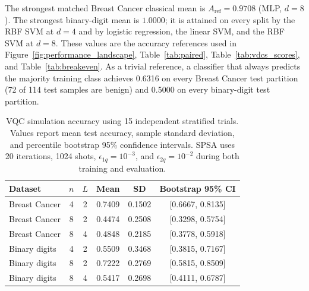 \documentclass[final,5p,times,number]{elsarticle}
\begin{document}
\begin{table}[!t]
{\begin{tabular}{llcccc}
\bottomrule
\end{tabular}}
\end{table}

The strongest matched Breast Cancer classical mean is $A_{\mathrm{ref}}=0.9708$ (MLP, $d=8$). The strongest binary-digit mean is $1.0000$; it is attained on every split by the RBF SVM at $d=4$ and by logistic regression, the linear SVM, and the RBF SVM at $d=8$. These values are the accuracy references used in Figure~\ref{fig:performance_landscape}, Table~\ref{tab:paired}, Table~\ref{tab:vdcs_scores}, and Table~\ref{tab:breakeven}. As a trivial reference, a classifier that always predicts the majority training class achieves 0.6316 on every Breast Cancer test partition (72 of 114 test samples are benign) and 0.5000 on every binary-digit test partition.

\begin{table}[!t]
\centering
\caption{VQC simulation accuracy using 15 independent stratified trials. Values report mean test accuracy, sample standard deviation, and percentile bootstrap 95\% confidence intervals. SPSA uses 20 iterations, 1024 shots, $\epsilon_{1q}=10^{-3}$, and $\epsilon_{2q}=10^{-2}$ during both training and evaluation.}
\label{tab:vqc_accuracy}
\small
\begin{tabular}{lccccc}
\toprule
\textbf{Dataset} & \textbf{$n$} & \textbf{$L$} &
\textbf{Mean} & \textbf{SD} & \textbf{Bootstrap 95\% CI} \\
\midrule
Breast Cancer & 4 & 2 & 0.7409 & 0.1502 & [0.6667, 0.8135] \\
Breast Cancer & 8 & 2 & 0.4474 & 0.2508 & [0.3298, 0.5754] \\
Breast Cancer & 8 & 4 & 0.4848 & 0.2185 & [0.3778, 0.5918] \\
Binary digits & 4 & 2 & 0.5509 & 0.3468 & [0.3815, 0.7167] \\
Binary digits & 8 & 2 & 0.7222 & 0.2769 & [0.5815, 0.8509] \\
Binary digits & 8 & 4 & 0.5417 & 0.2698 & [0.4111, 0.6787] \\
\bottomrule
\end{tabular}
\end{table}
\end{document}
